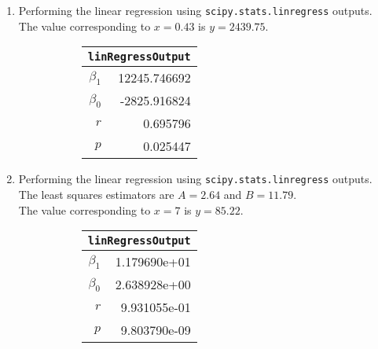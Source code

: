 \begin{enumerate}
\item Performing the linear regression using \texttt{scipy.stats.linregress} outputs. \\
The value corresponding to $ x = 0.43 $ is $ y = 2439.75 $.\\

\begin{figure}[H]
	\begin{subfigure}[]{0.2\linewidth}
		\centering
		\begin{tabular}{@{}rr@{}}
			\toprule
			\multicolumn{2}{c}{\texttt{linRegressOutput}} \\
			\midrule
			$\beta_1$     &     12245.746692 \\
			$\beta_0$ &     -2825.916824 \\
			$r$    &         0.695796 \\
			$p$    &         0.025447 \\
			\bottomrule
		\end{tabular}
		
	\end{subfigure}
	\begin{subfigure}[]{0.8\linewidth}
		\centering
		
	\end{subfigure}
\end{figure}


\item Performing the linear regression using \texttt{scipy.stats.linregress} outputs. \\
The least squares estimators are $ A = 2.64 $ and $ B = 11.79 $.\\
The value corresponding to $ x = 7 $ is $ y = 85.22 $.\\

\begin{figure}[H]
	\begin{subfigure}[]{0.2\linewidth}
		\centering
		\begin{tabular}{@{}rr@{}}
			\toprule
			\multicolumn{2}{c}{\texttt{linRegressOutput}} \\
			\midrule
			$\beta_1$     &     1.179690e+01 \\
			$\beta_0$ &     2.638928e+00 \\
			$r$    &     9.931055e-01 \\
			$p$    &     9.803790e-09 \\
			\bottomrule
		\end{tabular}
		

\end{subfigure}
\end{figure}
\end{enumerate}
